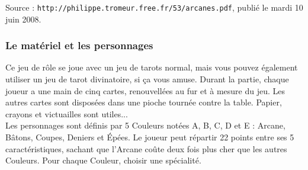 \documentclass[11pt,twoside,a5paper]{book}
\begin{document}
Source : \texttt{http://philippe.tromeur.free.fr/53/arcanes.pdf}, publi{\'e} le mardi 10 juin 2008.

\subsubsection{Le mat{\'e}riel et les personnages}

Ce jeu de r{\^o}le se joue avec un jeu de tarots normal, mais vous pouvez {\'e}galement utiliser un jeu de tarot divinatoire, si \c{c}a vous amuse.
Durant la partie, chaque joueur a une main de cinq cartes, renouvell{\'e}es au fur et {\`a} mesure du jeu. Les autres cartes sont dispos{\'e}es dans une pioche tourn{\'e}e contre la table.
Papier, crayons et victuailles sont utiles...~\\

Les personnages sont d{\'e}finis par 5 Couleurs not{\'e}es A, B, C, D et E : Arcane, B{\^a}tons, Coupes, Deniers et {\'E}p{\'e}es.
Le joueur peut r{\'e}partir 22 points entre ses 5 caract{\'e}ristiques, sachant que l'Arcane co{\^u}te deux fois plus cher que les autres Couleurs. 
Pour chaque Couleur, choisir une sp{\'e}cialit{\'e}. ~\\
\end{document}
